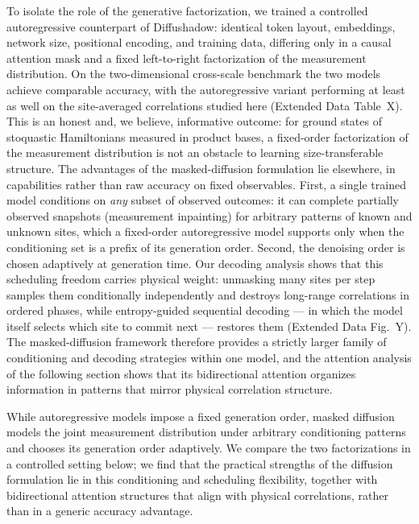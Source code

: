 To isolate the role of the generative factorization, we trained a
controlled autoregressive counterpart of Diffushadow: identical token
layout, embeddings, network size, positional encoding, and training data,
differing only in a causal attention mask and a fixed left-to-right
factorization of the measurement distribution. On the two-dimensional
cross-scale benchmark the two models achieve comparable accuracy, with the
autoregressive variant performing at least as well on the site-averaged
correlations studied here (Extended Data Table~X). This is an honest and,
we believe, informative outcome: for ground states of stoquastic
Hamiltonians measured in product bases, a fixed-order factorization of the
measurement distribution is not an obstacle to learning size-transferable
structure. The advantages of the masked-diffusion formulation lie
elsewhere, in capabilities rather than raw accuracy on fixed observables.
First, a single trained model conditions on \emph{any} subset of observed
outcomes: it can complete partially observed snapshots (measurement
inpainting) for arbitrary patterns of known and unknown sites, which a
fixed-order autoregressive model supports only when the conditioning set
is a prefix of its generation order. Second, the denoising order is chosen
adaptively at generation time. Our decoding analysis shows that this
scheduling freedom carries physical weight: unmasking many sites per step
samples them conditionally independently and destroys long-range
correlations in ordered phases, while entropy-guided sequential decoding
--- in which the model itself selects which site to commit next ---
restores them (Extended Data Fig.~Y). The masked-diffusion framework
therefore provides a strictly larger family of conditioning and decoding
strategies within one model, and the attention analysis of the following
section shows that its bidirectional attention organizes information in
patterns that mirror physical correlation structure.


While autoregressive models impose a fixed generation order, masked
diffusion models the joint measurement distribution under arbitrary
conditioning patterns and chooses its generation order adaptively. We
compare the two factorizations in a controlled setting below; we find
that the practical strengths of the diffusion formulation lie in this
conditioning and scheduling flexibility, together with bidirectional
attention structures that align with physical correlations, rather than
in a generic accuracy advantage.

